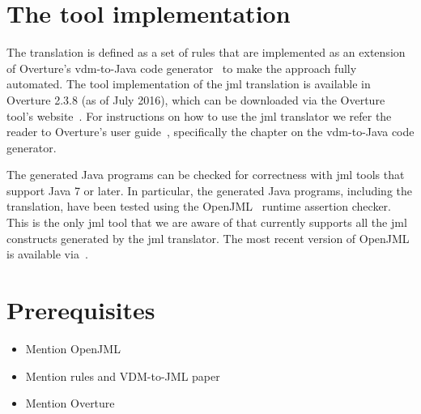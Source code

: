 \section{The tool implementation}

The translation is defined as a set of rules that are implemented as
an extension of Overture's \ac{vdm}-to-Java code
generator~\cite{Jorgensen&14a} to make the approach fully
automated. The tool implementation of the \ac{jml} translation is
available in Overture 2.3.8 (as of July 2016), which can be downloaded
via the Overture tool's website~\cite{OvertureWebsite}. For
instructions on how to use the \ac{jml} translator we refer the reader
to Overture's user guide~\cite{Larsen&10d}, specifically the chapter
on the \ac{vdm}-to-Java code generator.

The generated Java programs can be checked for correctness with
\ac{jml} tools that support Java 7 or later. In particular, the
generated Java programs, including the translation, have been tested
using the OpenJML~\cite{Cok&11} runtime assertion checker. This is the
only \ac{jml} tool that we are aware of that currently supports all
the \ac{jml} constructs generated by the \ac{jml} translator. The most
recent version of OpenJML is available via~\cite{OpenJMLWebsite}.

\section{Prerequisites}

\begin{itemize}
\item Mention OpenJML
\item Mention rules and VDM-to-JML paper
\item Mention Overture
\end{itemize}


